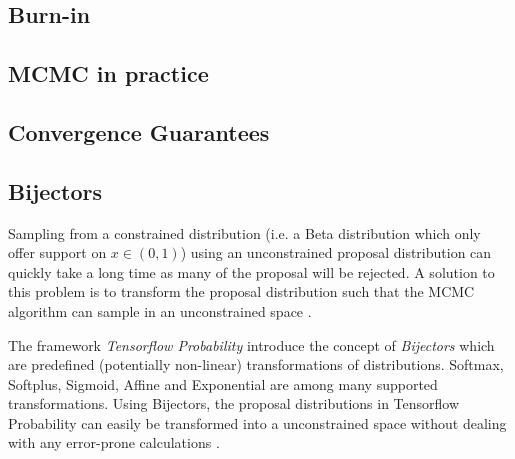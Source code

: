 \subsection{Burn-in}

\subsection{MCMC in practice}

\subsection{Convergence Guarantees}

\subsection{Bijectors}
Sampling from a constrained distribution (i.e. a Beta distribution which only offer support on $x \in (0, 1)$) using an unconstrained proposal distribution can quickly take a long time as many of the proposal will be rejected. A solution to this problem is to transform the proposal distribution such that the MCMC algorithm can sample in an unconstrained space \cite{Parno_2018, tensorflow2015-whitepaper}. 

The framework \textit{Tensorflow Probability} introduce the concept of \textit{Bijectors} which are predefined (potentially non-linear) transformations of distributions. Softmax, Softplus, Sigmoid, Affine and Exponential are among many supported transformations. Using Bijectors, the proposal distributions in Tensorflow Probability can easily be transformed into a unconstrained space without dealing with any error-prone calculations \cite{tensorflow2015-whitepaper}. 


